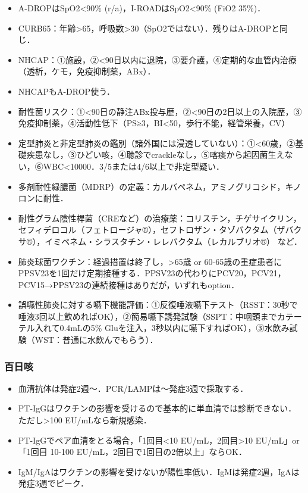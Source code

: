 \begin{itemize}
\item A-DROPはSpO2<90\% (r/a)，I-ROADはSpO2<90\% (FiO2 35\%)．
\item CURB65：年齢>65，呼吸数>30（SpO2ではない）．残りはA-DROPと同じ．
\item NHCAP：①施設，②<90日以内に退院，③要介護，④定期的な血管内治療（透析，ケモ，免疫抑制薬，ABx）．
\item NHCAPもA-DROP使う．
\item 耐性菌リスク：①<90日の静注ABx投与歴，②<90日の2日以上の入院歴，③免疫抑制薬，④活動性低下（PS≥3，BI<50，歩行不能，経管栄養，CV）


\item 定型肺炎と非定型肺炎の鑑別（諸外国には浸透していない）：①<60歳，②基礎疾患なし，③ひどい咳，④聴診でcrackleなし，⑤喀痰から起因菌生えない，⑥WBC<10000．3/5または4/6以上で非定型疑い．
\item 多剤耐性緑膿菌（MDRP）の定義：カルバペネム，アミノグリコシド，キノロンに耐性．
\item 耐性グラム陰性桿菌（CREなど）の治療薬：コリスチン，チゲサイクリン，セフィデロコル（フェトロージャ®），セフトロザン・タゾバクタム（ザバクサ®），イミペネム・シラスタチン・レレバクタム（レカルブリオ®）
など．
\item 肺炎球菌ワクチン：経過措置は終了し，>65歳 or 60-65歳の重症患者にPPSV23を1回だけ定期接種する．PPSV23の代わりにPCV20，PCV21，PCV15→PPSV23の連続接種はありだが，いずれもoption．


\item 誤嚥性肺炎に対する嚥下機能評価：①反復唾液嚥下テスト（RSST：30秒で唾液3回以上飲めればOK），②簡易嚥下誘発試験（SSPT：中咽頭までカテーテル入れて0.4mLの5\% Gluを注入，3秒以内に嚥下すればOK），③水飲み試験（WST：普通に水飲んでもらう）．
\end{itemize}


\subsubsection{百日咳}

\begin{itemize}
\item 血清抗体は発症2週〜．PCR/LAMPは〜発症3週で採取する．
\item PT-IgGはワクチンの影響を受けるので基本的に単血清では診断できない．ただし>100 EU/mLなら新規感染．
\item PT-IgGでペア血清をとる場合，「1回目<10 EU/mL，2回目>10 EU/mL」or「1回目 10-100 EU/mL，2回目で1回目の2倍以上」ならOK．
\item IgM/IgAはワクチンの影響を受けないが陽性率低い．IgMは発症2週，IgAは発症3週でピーク．
\end{itemize}



